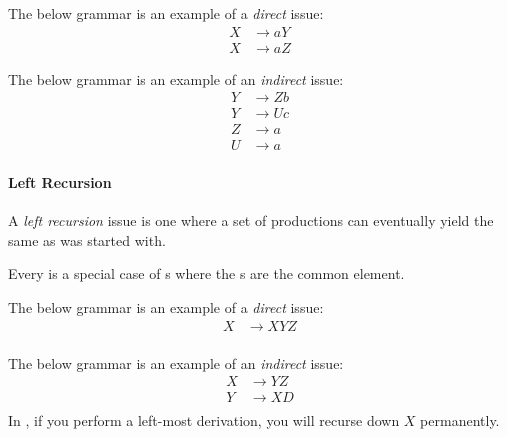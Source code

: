 The below grammar is an example of a \emph{direct}  issue:
\begin{equation}\label{eq:Direct_Common_Prefix}
  \begin{aligned}
    X &\rightarrow aY \\
    X &\rightarrow aZ
  \end{aligned}
\end{equation}

The below grammar is an example of an \emph{indirect}  issue:
\begin{equation}\label{eq:Indirect_Common_Prefix}
  \begin{aligned}
    Y &\rightarrow Zb \\
    Y &\rightarrow Uc \\
    Z &\rightarrow a \\
    U &\rightarrow a
  \end{aligned}
\end{equation}

\paragraph{Left Recursion}\label{par:LLParsing_Issues_Left_Recursion}
\begin{definition}\label{def:Left_Recursion}
  A \emph{left recursion} issue is one where a set of productions can eventually yield the same  as was started with.

  \begin{remark}
    Every  is a special case of s where the s are the common element.
  \end{remark}  
\end{definition}

The below grammar is an example of a \emph{direct}  issue:
\begin{equation}\label{eq:Direct_Left_Recursion}
  \begin{aligned}
    X &\rightarrow XYZ \\
  \end{aligned}
\end{equation}

The below grammar is an example of an \emph{indirect}  issue:
\begin{equation}\label{eq:Indirect_Left_Recursion}
  \begin{aligned}
    X &\rightarrow YZ \\
    Y &\rightarrow XD \\
  \end{aligned}
\end{equation}
In , if you perform a left-most derivation, you will recurse down $X$ permanently.


